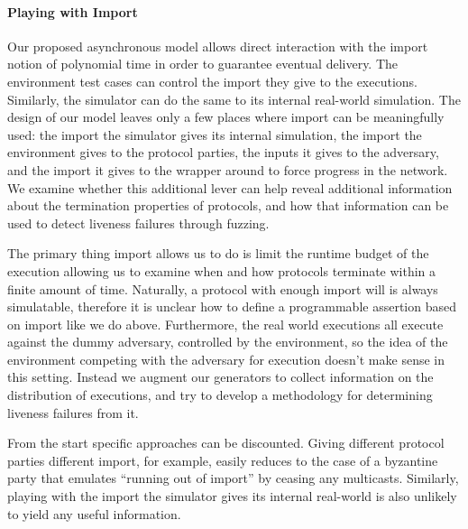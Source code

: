 
\paragraph{Playing with Import}
Our proposed asynchronous model allows direct interaction with the import notion of polynomial time in order to guarantee eventual delivery.
The environment test cases can control the import they give to the executions. Similarly, the simulator can do the same to its internal real-world simulation.
The design of our model leaves only a few places where import can be meaningfully used: the import the simulator gives its internal simulation, the import the environment gives to the protocol parties, the inputs it gives to the adversary, and the import it gives to the wrapper around \F to force progress in the network.
We examine whether this additional lever can help reveal additional information about the termination properties of protocols, and how that information can be used to detect liveness failures through fuzzing.

The primary thing import allows us to do is limit the runtime budget of the execution allowing us to examine when and how protocols terminate within a finite amount of time.
Naturally, a protocol with enough import will is always simulatable, therefore it is unclear how to define a programmable assertion based on import like we do above.
Furthermore, the real world executions all execute against the dummy adversary, controlled by the environment, so the idea of the environment competing with the adversary for execution doesn't make sense in this setting.
Instead we augment our generators to collect information on the distribution of executions, and try to develop a methodology for determining liveness failures from it.

From the start specific approaches can be discounted. 
Giving different protocol parties different import, for example, easily reduces to the case of a byzantine party that emulates ``running out of import'' by ceasing any multicasts.
Similarly, playing with the import the simulator gives its internal real-world is also unlikely to yield any useful information.


